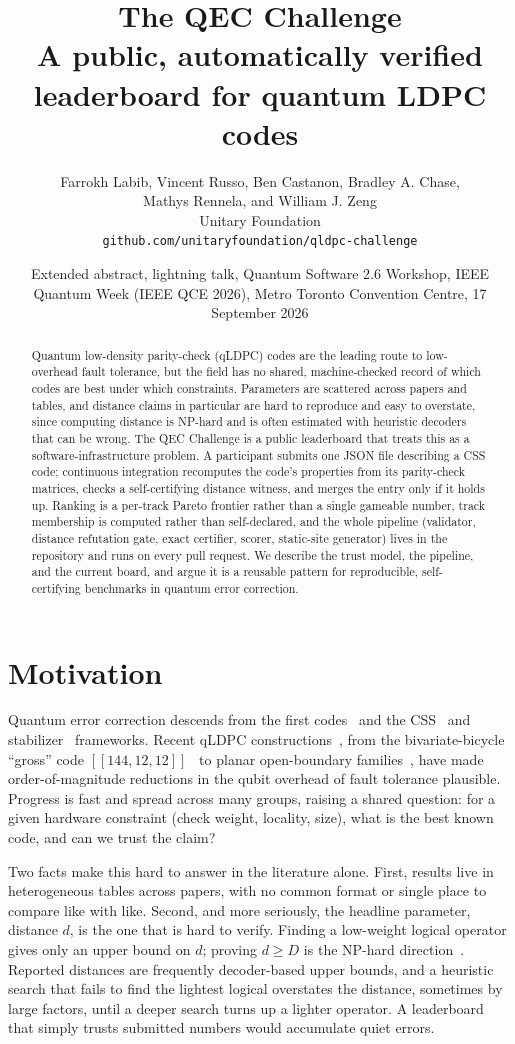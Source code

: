 \documentclass[11pt]{article}
\title{\textbf{The QEC Challenge}\\[4pt]
  \large A public, automatically verified leaderboard for quantum LDPC codes}
\author{Farrokh Labib, Vincent Russo, Ben Castanon, Bradley A. Chase,\\
  Mathys Rennela, and William J. Zeng\\[4pt]
  Unitary Foundation\\
  \texttt{github.com/unitaryfoundation/qldpc-challenge}}
\date{Extended abstract, lightning talk, Quantum Software 2.6 Workshop,
  IEEE Quantum Week (IEEE QCE 2026), Metro Toronto Convention Centre,
  17 September 2026}
\begin{document}
\maketitle

\begin{abstract}
Quantum low-density parity-check (qLDPC) codes are the leading route to
low-overhead fault tolerance, but the field has no shared, machine-checked record
of which codes are best under which constraints. Parameters are scattered across
papers and tables, and distance claims in particular are hard to reproduce and
easy to overstate, since computing distance is NP-hard and is often estimated
with heuristic decoders that can be wrong. The QEC Challenge is a public
leaderboard that treats this as a software-infrastructure problem. A participant
submits one JSON file describing a CSS code; continuous integration recomputes
the code's properties from its parity-check matrices, checks a self-certifying
distance witness, and merges the entry only if it holds up. Ranking is a
per-track Pareto frontier rather than a single gameable number, track membership
is computed rather than self-declared, and the whole pipeline (validator,
distance refutation gate, exact certifier, scorer, static-site generator) lives
in the repository and runs on every pull request. We describe the trust model,
the pipeline, and the current board, and argue it is a reusable pattern for
reproducible, self-certifying benchmarks in quantum error correction.
\end{abstract}

\section{Motivation}

Quantum error correction descends from the first codes~\cite{shor1995scheme} and
the CSS~\cite{calderbank1996good,steane1996error} and
stabilizer~\cite{gottesman1997stabilizer} frameworks. Recent qLDPC
constructions~\cite{breuckmann2021quantum,tillich2014quantum}, from the
bivariate-bicycle ``gross'' code $[[144,12,12]]$~\cite{bravyi2024high} to planar
open-boundary families~\cite{liang2025planar}, have made order-of-magnitude
reductions in the qubit overhead of fault tolerance plausible. Progress is fast
and spread across many groups, raising a shared question: for a given hardware
constraint (check weight, locality, size), what is the best known code, and can
we trust the claim?

Two facts make this hard to answer in the literature alone. First, results live
in heterogeneous tables across papers, with no common format or single place to
compare like with like. Second, and more seriously, the headline parameter,
distance $d$, is the one that is hard to verify. Finding a low-weight logical
operator gives only an upper bound on $d$; proving $d \ge D$ is the NP-hard
direction~\cite{kapshikar2023hardness}. Reported
distances are frequently decoder-based upper bounds, and a heuristic search
that fails to find the lightest logical overstates the distance,
sometimes by large factors, until a deeper search turns up a lighter operator. A
leaderboard that simply trusts submitted numbers would accumulate quiet errors.
\end{document}
